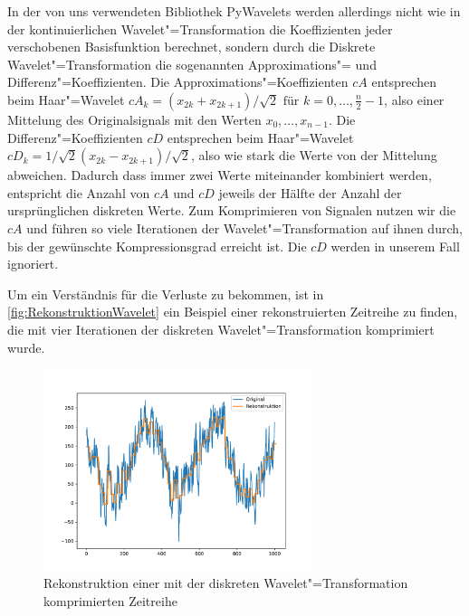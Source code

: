 In der von uns verwendeten Bibliothek PyWavelets \cite{pyWavelets} werden allerdings nicht wie in der kontinuierlichen Wavelet"=Transformation die Koeffizienten jeder verschobenen Basisfunktion berechnet, sondern durch die Diskrete Wavelet"=Transformation die sogenannten Approximations"= und Differenz"=Koeffizienten. Die Approximations"=Koeffizienten $cA$ entsprechen beim Haar"=Wavelet $cA_k = (x_{2k} + x_{2k+1})/\sqrt{2} \text{ für } k=0,\ldots,\frac{n}{2}-1$, also einer Mittelung des Originalsignals mit den Werten $x_0,\ldots,x_{n-1}$. Die Differenz"=Koeffizienten $cD$ entsprechen beim Haar"=Wavelet $cD_k = 1/\sqrt{2}(x_{2k}-x_{2k+1})/\sqrt{2}$, also wie stark die Werte von der Mittelung abweichen. Dadurch dass immer zwei Werte miteinander kombiniert werden, entspricht die Anzahl von $cA$ und $cD$ jeweils der Hälfte der Anzahl der ursprünglichen diskreten Werte. Zum Komprimieren von Signalen nutzen wir die $cA$ und führen so viele Iterationen der Wavelet"=Transformation auf ihnen durch, bis der gewünschte Kompressionsgrad erreicht ist. Die $cD$ werden in unserem Fall ignoriert.

Um ein Verständnis für die Verluste zu bekommen, ist in \autoref{fig:RekonstruktionWavelet} ein Beispiel einer rekonstruierten Zeitreihe zu finden, die mit vier Iterationen der diskreten Wavelet"=Transformation komprimiert wurde.
\begin{figure}[bth] 
  \centering
  \includegraphics[width=0.7\textwidth]{Graphics/RekonstruktionWavelet.pdf}
  \caption{Rekonstruktion einer mit der diskreten Wavelet"=Transformation komprimierten Zeitreihe}
  \label{fig:RekonstruktionWavelet}
\end{figure}